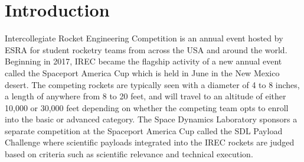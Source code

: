 \documentclass[conference]{IEEEtran} %
\begin{document}
\label{sec:nomenclature}
\newcommand{\nomunit}[1]{%
\renewcommand{\nomentryend}{\hspace*{\fill}#1}}
\renewcommand{\nompreamble}{

  }
\printnomenclature{}



\section{Introduction}
\label{sec:Introduction}

 Intercollegiate Rocket Engineering Competition is an annual event hosted by ESRA for student rocketry teams from across the USA and around the world.
Beginning in 2017, IREC became the flagship activity of a new annual event called the Spaceport America Cup which is held in June in the New Mexico desert.
The competing rockets are typically seen with a diameter of 4 to 8 inches, a length of anywhere from 8 to 20 feet, and will travel to an altitude of either 10,000 or 30,000
feet depending on whether the competing team opts to enroll into the basic or advanced category. The Space Dynamics Laboratory sponsors a separate competition at the
Spaceport America Cup called the SDL Payload Challenge where scientific payloads integrated into the IREC rockets are judged based on criteria such as scientific relevance and technical execution.
\end{document}
